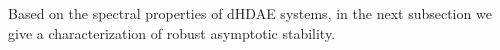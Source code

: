\documentclass[11pt]{article}
\newcommand {\mat}[1]{\left[\begin{array}{#1}}
\newcommand {\rix}{\end{array}\right]}
\newtheorem{lemma}[theorem]{Lemma}
\def\eproof{\space
        {\ \vbox{\hrule\hbox{\vrule height1.3ex\hskip0.8ex\vrule}\hrule}}
        \bigskip}
\begin{document}

Based on the spectral properties of dHDAE systems, in the next subsection we give a characterization of robust asymptotic stability.
\end{document}
